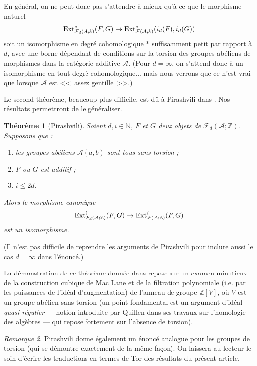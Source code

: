 \documentclass[a4paper,10pt]{article}
\newcommand{\A}{{\mathcal{A}}}
\newcommand{\F}{{\mathcal{F}}}
\newtheorem{thm}{Th\'eor\`eme}[section]
\theoremstyle{definition}
\theoremstyle{remark}
\newtheorem{rem}[thm]{Remarque}
\begin{document}
En général, on ne peut donc pas s'attendre à mieux qu'à ce que le morphisme naturel
$${\rm Ext}^*_{\F_d(\A;k)}(F,G)\to {\rm Ext}^*_{\F(\A;k)}(i_d(F),i_d(G))$$
soit un isomorphisme en degré cohomologique $*$ suffisamment petit par rapport à $d$, avec une borne dépendant de conditions sur la torsion des groupes abéliens de morphismes dans la catégorie additive $\A$. (Pour $d=\infty$, on s'attend donc à un isomorphisme en tout degré cohomologique... mais nous verrons que ce n'est vrai que lorsque $\A$ est <<~assez gentille~>>.)

\smallskip

Le second théorème, beaucoup plus difficile, est dû à Pirashvili dans \cite{P-extor}. Nos résultats permettront de le généraliser.

\begin{thm}[Pirashvili]\label{th-pira}
 Soient $d,i\in\mathbb{N}$, $F$ et $G$ deux objets de $\F_d(\A;\mathbb{Z})$. Supposons que :
\begin{enumerate}
 \item les groupes abéliens $\A(a,b)$ sont tous sans torsion ;
\item $F$ ou $G$ est additif ;
\item $i\leq 2d$.
\end{enumerate}

Alors le morphisme canonique
$${\rm Ext}^i_{\F_d(\A;\mathbb{Z})}(F,G)\to {\rm Ext}^i_{\F(\A;\mathbb{Z})}(F,G)$$
est un isomorphisme.
\end{thm}

(Il n'est pas difficile de reprendre les arguments de Pirashvili pour inclure aussi le cas $d=\infty$ dans l'énoncé.)

La démonstration de ce théorème donnée dans \cite{P-extor} repose sur un examen minutieux de la construction cubique de Mac Lane et de la filtration polynomiale (i.e. par les puissances de l'idéal d'augmentation) de l'anneau de groupe $\mathbb{Z}[V]$, où $V$ est un groupe abélien sans torsion (un point fondamental est un argument d'idéal {\em quasi-régulier} --- notion introduite par Quillen dans ses travaux sur l'homologie des algèbres --- qui repose fortement sur l'absence de torsion).

\begin{rem}
 Pirashvili donne également un énoncé analogue pour les groupes de torsion (qui se démontre exactement de la même façon). On laissera au lecteur le soin d'écrire les traductions en termes de Tor des résultats du présent article.
\end{rem}
\end{document}
